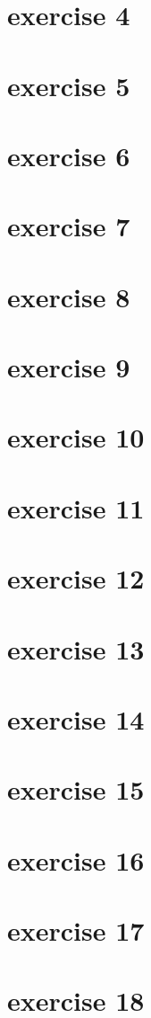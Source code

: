 \documentclass{article}
\begin{document}
\section{exercise 4}
\section{exercise 5}
\section{exercise 6}
\section{exercise 7}
\section{exercise 8}
\section{exercise 9}
\section{exercise 10}
\section{exercise 11}
\section{exercise 12}
\section{exercise 13}
\section{exercise 14}
\section{exercise 15}
\section{exercise 16}
\section{exercise 17}
\section{exercise 18}
\end{document}
